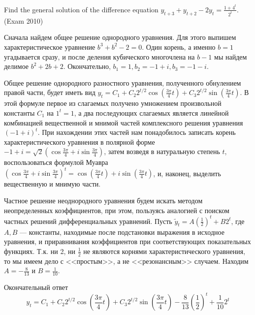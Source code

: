 \begin{problem}
Find the general solution of the difference equation $y_{t+3} +y_{t+2} -2y_{t} =\frac{1+4^{t} }{2^{t} } $. (Exam 2010)


\begin{sol}
Сначала найдем общее решение однородного уравнения. Для этого выпишем характеристическое уравнение $b^{3} +b^{2} -2=0$. Один корень, а именно $b=1$ угадывается сразу, и после деления кубического многочлена на $b-1$ мы найдем делимое $b^{2} +2b+2$. Окончательно, $b_{1} =1, b_{2} =-1+i, b_{3} =-1-i$.

Общее решение однородного разностного уравнения, полученного обнулением правой части, будет иметь вид $y_{t} =C_{1} +C_{2} 2^{t/2} \cos \left(\frac{3\pi }{4} t\right)+C_{3} 2^{t/2} \sin \left(\frac{3\pi }{4} t \right)$. В этой формуле первое из слагаемых получено умножением произвольной константы $C_{1} $ на $1^{t} =1$, а два последующих слагаемых является линейной комбинацией вещественной и мнимой частей комплексного решения уравнения $(-1+i)^{t} $. При нахождении этих частей нам понадобилось записать корень характеристического уравнения в полярной форме $-1+i=\sqrt{2} \left(\cos \frac{3\pi }{4} +i\sin \frac{3\pi }{4} \right)$, затем возведя в натуральную степень $t$, воспользоваться формулой Муавра $\left(\cos \frac{3\pi }{4} +i\sin \frac{3\pi }{4} \right)^{t} =\cos \left(\frac{3\pi }{4} t \right)+i\sin \left(\frac{3\pi }{4} t \right)$, и, наконец, выделить вещественную и мнимую части.

Частное решение неоднородного уравнения будем искать методом неопределенных коэффициентов, при этом, пользуясь аналогией с поиском частных решений дифференциальных уравнений. Пусть $\tilde{y}_{t} =A \left(\frac{1}{2} \right)^{t} +B2^{t} $, где $A, B$ --- константы, находимые после подстановки выражения в исходное уравнения, и приравнивания коэффициентов при соответствующих показательных функциях. Т.к. ни 2, ни $\frac{1}{2} $ не являются корнями характеристического уравнения, то мы имеем дело с <<простым>>, а не <<резонансным>> случаем. Находим $A=-\frac{8}{13} $ и $B=\frac{1}{10} $.

Окончательный ответ
\[
y_{t} =C_{1} +C_{2} 2^{t/2} \cos \left(\frac{3\pi }{4} t \right)+
C_{3} 2^{t/2} \sin \left(\frac{3\pi }{4} t \right)-\frac{8}{13} \left(\frac{1}{2} \right)^{t} +\frac{1}{10} 2^{t}
\]
\end{sol}
\end{problem}


